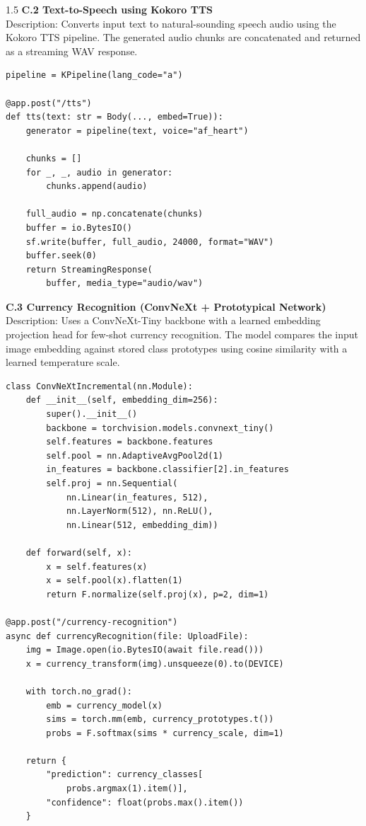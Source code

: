 \begin{spacing}{1.5}
\noindent \textbf{C.2 Text-to-Speech using Kokoro TTS}\\
Description: Converts input text to natural-sounding speech audio using the Kokoro TTS pipeline. The generated audio chunks are concatenated and returned as a streaming WAV response.
\begin{verbatim}
pipeline = KPipeline(lang_code="a")

@app.post("/tts")
def tts(text: str = Body(..., embed=True)):
    generator = pipeline(text, voice="af_heart")

    chunks = []
    for _, _, audio in generator:
        chunks.append(audio)

    full_audio = np.concatenate(chunks)
    buffer = io.BytesIO()
    sf.write(buffer, full_audio, 24000, format="WAV")
    buffer.seek(0)
    return StreamingResponse(
        buffer, media_type="audio/wav")
\end{verbatim}
\thispagestyle{empty}
\noindent \textbf{C.3 Currency Recognition (ConvNeXt + Prototypical Network)}\\
Description: Uses a ConvNeXt-Tiny backbone with a learned embedding projection head for few-shot currency recognition. The model compares the input image embedding against stored class prototypes using cosine similarity with a learned temperature scale.
\begin{verbatim}
class ConvNeXtIncremental(nn.Module):
    def __init__(self, embedding_dim=256):
        super().__init__()
        backbone = torchvision.models.convnext_tiny()
        self.features = backbone.features
        self.pool = nn.AdaptiveAvgPool2d(1)
        in_features = backbone.classifier[2].in_features
        self.proj = nn.Sequential(
            nn.Linear(in_features, 512),
            nn.LayerNorm(512), nn.ReLU(),
            nn.Linear(512, embedding_dim))

    def forward(self, x):
        x = self.features(x)
        x = self.pool(x).flatten(1)
        return F.normalize(self.proj(x), p=2, dim=1)

@app.post("/currency-recognition")
async def currencyRecognition(file: UploadFile):
    img = Image.open(io.BytesIO(await file.read()))
    x = currency_transform(img).unsqueeze(0).to(DEVICE)

    with torch.no_grad():
        emb = currency_model(x)
        sims = torch.mm(emb, currency_prototypes.t())
        probs = F.softmax(sims * currency_scale, dim=1)

    return {
        "prediction": currency_classes[
            probs.argmax(1).item()],
        "confidence": float(probs.max().item())
    }
\end{verbatim}


\end{spacing}

